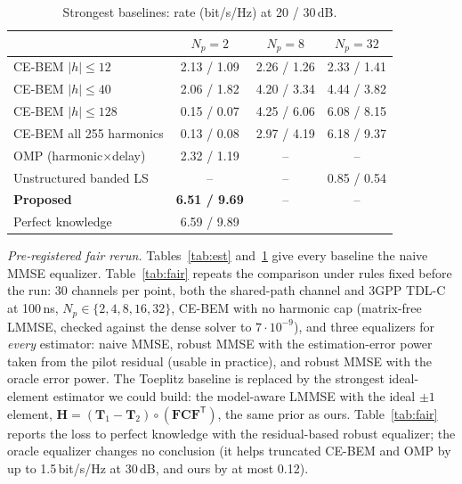 \begin{table}[!htbp]\centering
\caption{Strongest baselines: rate (bit/s/Hz) at 20 / 30\,dB.}\label{tab:bem}
\begin{tabular}{lccc}\toprule
 & $N_p=2$ & $N_p=8$ & $N_p=32$ \\\midrule
CE-BEM $|h|\le12$ & 2.13 / 1.09 & 2.26 / 1.26 & 2.33 / 1.41 \\
CE-BEM $|h|\le40$ & 2.06 / 1.82 & 4.20 / 3.34 & 4.44 / 3.82 \\
CE-BEM $|h|\le128$ & 0.15 / 0.07 & 4.25 / 6.06 & 6.08 / 8.15 \\
CE-BEM all 255 harmonics & 0.13 / 0.08 & 2.97 / 4.19 & 6.18 / 9.37 \\
OMP (harmonic$\times$delay) & 2.32 / 1.19 & -- & -- \\
Unstructured banded LS & -- & -- & 0.85 / 0.54 \\
\textbf{Proposed} & \textbf{6.51 / 9.69} & -- & -- \\
Perfect knowledge & 6.59 / 9.89 & & \\\bottomrule
\end{tabular}
\end{table}

\emph{Pre-registered fair rerun.} Tables~\ref{tab:est} and~\ref{tab:bem} give every baseline the naive MMSE
equalizer. Table~\ref{tab:fair} repeats the comparison under rules fixed before the run: 30 channels per point, both
the shared-path channel and 3GPP TDL-C at 100\,ns, $N_p\in\{2,4,8,16,32\}$, CE-BEM with no harmonic cap (matrix-free
LMMSE, checked against the dense solver to $7\cdot10^{-9}$), and three equalizers for \emph{every} estimator: naive
MMSE, robust MMSE with the estimation-error power taken from the pilot residual (usable in practice), and robust MMSE
with the oracle error power. The Toeplitz baseline is replaced by the strongest ideal-element estimator we could build:
the model-aware LMMSE with the ideal $\pm1$ element, $\bm H=(\bm T_1-\bm T_2)\circ(\bm F\bm C\bm F^{\mathsf T})$, the
same prior as ours. Table~\ref{tab:fair} reports the loss to perfect knowledge with the residual-based robust
equalizer; the oracle equalizer changes no conclusion (it helps truncated CE-BEM and OMP by up to 1.5\,bit/s/Hz at
30\,dB, and ours by at most 0.12).

